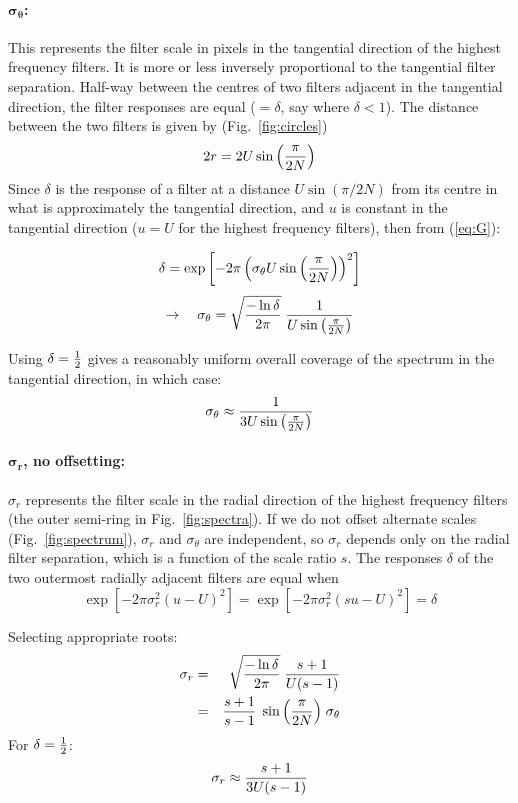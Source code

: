 \documentclass[12pt,a4]{article}
\begin{document}
\paragraph{$\mathbf{\sigma_\theta}$:} 
This represents the filter scale in pixels in the tangential direction of the highest frequency filters.  It is more or less inversely proportional to the tangential filter separation.  Half-way between the centres of two filters adjacent in the tangential direction, the filter responses are equal ($=\delta$, say where $\delta < 1$). The distance between the two filters is given by (Fig.~\ref{fig:circles})
\def\Sinpbnn{\sin{\left(\pi\over2N\right)}}
\[ 2r = 2U \Sinpbnn \]
Since  $\delta$ is the response of a filter at a distance $U\sin(\pi/2N)$ from its centre in what is approximately the tangential direction, and $u$ is constant in the tangential direction ($u = U$ for the highest frequency filters), then from (\ref{eq:G}):

\[ \delta = \exp \left[ -2\pi \left(\sigma_\theta U \Sinpbnn\right)^2  \right] \]
\[ \rightarrow\quad \sigma_\theta =
  \sqrt{-\ln\delta \over 2\pi}\; {1 \over U\Sinpbnn} 
\]

Using $\delta = {1\over2}$ gives a reasonably uniform overall coverage of the spectrum in the tangential direction, in which case:
\[ \sigma_\theta \approx {1 \over 3 U\Sinpbnn} \]

\paragraph{$\mathbf{\sigma_r}$, no offsetting:}
$\sigma_r$ represents the filter scale in the radial direction of the highest frequency filters (the outer semi-ring in Fig.~\ref{fig:spectra}).  If we do not offset alternate scales (Fig.~\ref{fig:spectrum}), $\sigma_r$ and $\sigma_\theta$ are independent, so $\sigma_r$ depends only on the radial filter separation, which is a function of the scale ratio $s$.  The responses $\delta$ of the two outermost radially adjacent filters are equal when
\[ \exp\left[ -2\pi \sigma_r^2 (u-U)^2\right]
= \exp\left[ -2\pi \sigma_r^2 \left(su-U\right)^2\right] = \delta \]

Selecting appropriate roots:
\begin{eqnarray}
   \sigma_r &=& \sqrt{-\ln{\delta}\over 2\pi} \;{s+1\over U(s-1)} \label{eq:sigma_r}\\
   &=& {s+1\over s-1}\; \Sinpbnn\; \sigma_\theta \nonumber
\end{eqnarray}
For $\delta={1\over2}$:
\[ \sigma_r \approx {s+1\over 3U(s-1)} \]
 
\end{document}
